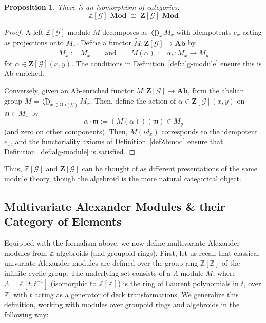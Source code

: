 \documentclass[a4paper,12pt]{article}
\newtheorem{proposition}{Proposition}[section]
\newcommand{\Z}{\mathbb{Z}}
\newcommand{\Zb}{\mathbf{Z}}
\newcommand{\Lam}{\Lambda}
\newcommand{\calG}{\mathcal{G}}
\newcommand{\Ab}{\mathbf{Ab}}
\newcommand{\Ob}{\mathrm{Ob}}
\newcommand{\m}{\mathfrak{m}}
\begin{document}
\begin{proposition}
There is an isomorphism of categories: 
\[  \Z[\calG]\textbf{-Mod}  \;\cong\;  \Zb[\calG]\textbf{-Mod}     \]
\end{proposition}
\begin{proof}
A left $\Z[\calG]$-module $M$ decomposes as $\bigoplus_{x} M_x$ with idempotents $e_x$ acting as projections onto $M_x$.  
Define a functor  $\tilde{M} : \Zb[\calG] \to \Ab$   by 
$$\tilde{M}_x := M_x  \qquad  \mbox{and}  \qquad  \tilde{M}(\alpha) := \alpha_* : M_x \to M_y$$ 
for $\alpha \in \Zb[\calG](x,y)$.  
The conditions in Definition~\ref{def:alg-module} ensure this is Ab-enriched.

Conversely, given an Ab-enriched functor $M : \Zb[\calG] \to \Ab$, form the abelian  group $\overline{M} = \bigoplus_{x \in \Ob(\calG)} M_x$. Then, define the action of $\alpha \in \Zb[\calG](x,y)$ on $\m \in M_x$ by
$$\alpha \cdot \m := (M(\alpha))(\m) \in M_y$$  
(and zero on other components). Then, $M(id_x)$ corresponds to the idempotent $e_x$, and the functoriality axioms of  Definition~\ref{defZbmod} ensure that Definition~\ref{def:alg-module} is satisfied.  
\end{proof}
Thus, $\Z[\calG]$ and $\Zb[\calG]$ can be thought of as different presentations of the same module theory, though the algebroid is the more natural categorical object.  


\subsection{Multivariate Alexander Modules \& their Category of Elements}

Equipped with the formalism above, we now define multivariate Alexander modules from $\Z$-algebroids (and groupoid rings). First, let us recall that classical univariate Alexander modules are defined over the group ring  $\Z[\Z]$ of the infinite cyclic group. The underlying set consists of a  $\Lam$-module $M$, where $\Lam = \Z[t, t^{-1}]$  (isomorphic to $\Z[\Z]$) is the ring of Laurent polynomials in $t$, over $\Z$, with $t$ acting as a generator of deck transformations. We generalize this definition, working with modules over  groupoid rings and algebroids in the following way:    
 
\end{document}
